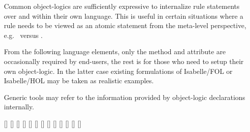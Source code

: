 \begin{isabellebody}
\begin{isamarkuptext}
  Common object-logics are sufficiently expressive to internalize rule
  statements over  and  within their own
  language.  This is useful in certain situations where a rule needs
  to be viewed as an atomic statement from the meta-level perspective,
  e.g.\  versus .

  From the following language elements, only the \hyperlink{method.atomize}{\mbox{}}
  method and \hyperlink{attribute.rule-format}{\mbox{}} attribute are occasionally
  required by end-users, the rest is for those who need to setup their
  own object-logic.  In the latter case existing formulations of
  Isabelle/FOL or Isabelle/HOL may be taken as realistic examples.

  Generic tools may refer to the information provided by object-logic
  declarations internally.

  \begin{railoutput}
[]
[]
[]
[]
\rail@bar
{}
[]
\rail@endbar
\rail@end
{}
[]
\rail@bar
{}
[]
[]
[]
\rail@endbar
\rail@end
{}
[]
\rail@bar
{}
[]
[]
[]
\rail@endbar
\rail@end
\end{railoutput}



\end{isamarkuptext}
\end{isabellebody}
